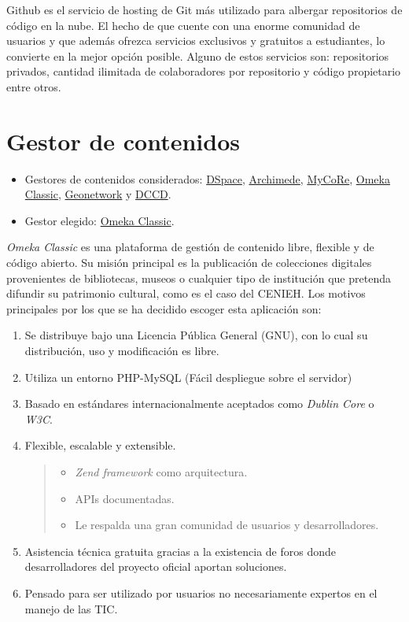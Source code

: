 Github es el servicio de {hosting} de Git más utilizado para albergar
repositorios de código en la nube. El hecho de que cuente con una enorme
comunidad de usuarios y que además ofrezca servicios exclusivos y
gratuitos a estudiantes, lo convierte en la mejor opción posible. Alguno
de estos servicios son: repositorios privados, cantidad ilimitada de
colaboradores por repositorio y código propietario entre otros.

\section{Gestor de contenidos}

\begin{itemize}
\tightlist
\item
  Gestores de contenidos considerados:
  \href{https://duraspace.org/dspace/}{DSpace},
  \href{https://www.bibl.ulaval.ca/archimede/index.en.html}{Archimede},
  \href{https://www.mycore.de/}{MyCoRe},
  \href{https://omeka.org/classic/}{Omeka Classic},
  \href{https://github.com/geonetwork/core-geonetwork/}{Geonetwork} y
  \href{https://github.com/DANS-KNAW/dccd-webui}{DCCD}.
\item
  Gestor elegido: \href{https://omeka.org/classic/}{Omeka Classic}.
\end{itemize}

\emph{Omeka Classic} es una plataforma de gestión de contenido libre,
flexible y de código abierto. Su misión principal es la publicación de
colecciones digitales provenientes de bibliotecas, museos o cualquier
tipo de institución que pretenda difundir su patrimonio cultural, como
es el caso del CENIEH. Los motivos principales por los que se ha
decidido escoger esta aplicación son:

\begin{enumerate}
\def\labelenumi{\arabic{enumi}.}
\item
  Se distribuye bajo una Licencia Pública General (GNU), con lo cual su
  distribución, uso y modificación es libre.
\item
  Utiliza un entorno PHP-MySQL (Fácil despliegue sobre el servidor)
\item
  Basado en estándares internacionalmente aceptados como \emph{Dublin
  Core} o \emph{W3C}.
\item
  Flexible, escalable y extensible.

  \begin{quote}
  \begin{itemize}
  \tightlist
  \item
    \emph{Zend framework} como arquitectura.
  \item
    APIs documentadas.
  \item
    Le respalda una gran comunidad de usuarios y desarrolladores.
  \end{itemize}
  \end{quote}
\item
  Asistencia técnica gratuita gracias a la existencia de foros donde
  desarrolladores del proyecto oficial aportan soluciones.
\item
  Pensado para ser utilizado por usuarios no necesariamente expertos en
  el manejo de las TIC.
\end{enumerate}

